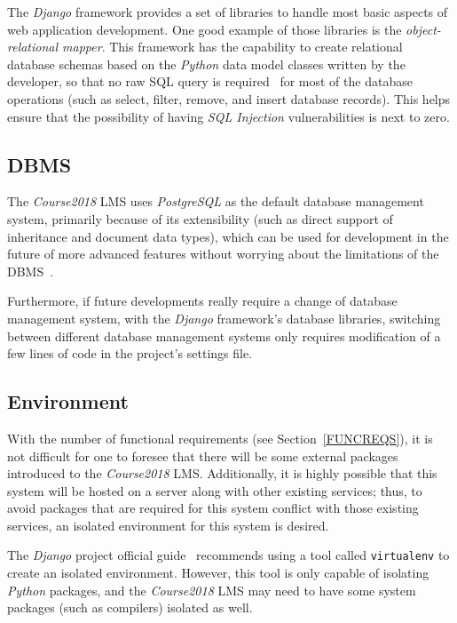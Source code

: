 The \emph{Django} framework provides a set of libraries to handle most basic
aspects of web application development. One good example of those libraries is
the \emph{object-relational mapper}. This framework has the capability to create
relational database schemas based on the \emph{Python} data model classes
written by the developer, so that no raw SQL query is required~\cite[Chapter 1]{django}
for most of the
database operations (such as select, filter, remove, and insert database
records).
This helps ensure that the possibility of having \emph{SQL Injection}
vulnerabilities is next to zero.

\subsection{DBMS}
The \emph{Course2018} LMS uses \emph{PostgreSQL} as the default database
management system, primarily because of its extensibility (such as direct
support of inheritance and document data types), which can be used for
development in the future of more advanced features without worrying about the
limitations of the DBMS~\cite{postgres}.

\medskip

Furthermore, if future developments really require a change of database
management system,
with the \emph{Django} framework's database libraries,
switching between different database management systems only requires
modification of a few lines of code in the project's settings file.

\subsection{Environment}
With the number of functional requirements (see Section~\ref{FUNCREQS}), it is not difficult for
one to foresee that there will be some external packages introduced to the
\emph{Course2018} LMS.
Additionally, it is highly possible that this system will be hosted
on a server along with other existing services; thus, to avoid packages that
are required for this system conflict with those existing services, an
isolated environment for this system is desired.

\medskip
The \emph{Django} project official guide~\cite{BdjangoGuide} recommends using
a tool called \texttt{virtualenv} to create an isolated environment. However,
this tool is only capable of isolating \emph{Python} packages, and the
\emph{Course2018} LMS may need to have some system packages (such as
compilers) isolated as well.


